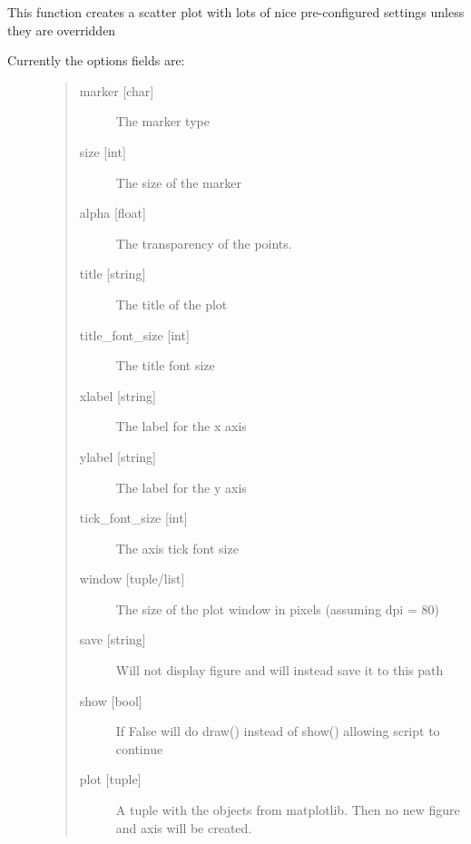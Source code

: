 \documentclass[letterpaper,10pt,english]{sphinxmanual}
\begin{document}
\begin{fulllineitems}
\label{\detokenize{modules/dpt_tools:dpt_tools.scatter}}
This function creates a scatter plot with lots of nice pre-configured settings unless they are overridden
\begin{description}
\item[{Currently the options fields are:}] \leavevmode\begin{quote}\begin{description}
\item[{marker {[}char{]}}] \leavevmode
The marker type

\item[{size {[}int{]}}] \leavevmode
The size of the marker

\item[{alpha {[}float{]}}] \leavevmode
The transparency of the points.

\item[{title {[}string{]}}] \leavevmode
The title of the plot

\item[{title\_font\_size {[}int{]}}] \leavevmode
The title font size

\item[{xlabel {[}string{]}}] \leavevmode
The label for the x axis

\item[{ylabel {[}string{]}}] \leavevmode
The label for the y axis

\item[{tick\_font\_size {[}int{]}}] \leavevmode
The axis tick font size

\item[{window {[}tuple/list{]}}] \leavevmode
The size of the plot window in pixels (assuming dpi = 80)

\item[{save {[}string{]}}] \leavevmode
Will not display figure and will instead save it to this path

\item[{show {[}bool{]}}] \leavevmode
If False will do draw() instead of show() allowing script to continue

\item[{plot {[}tuple{]}}] \leavevmode
A tuple with the  objects from matplotlib. Then no new figure and axis will be created.


\end{description}
\end{quote}
\end{description}
\end{fulllineitems}
\end{document}
